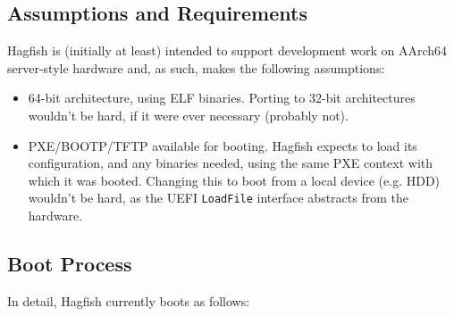 \documentclass[a4paper,twoside]{report}
\begin{document}
\subsection{Assumptions and Requirements}

Hagfish is (initially at least) intended to support development work on
AArch64 server-style hardware and, as such, makes the following assumptions:

\begin{itemize}
\item 64-bit architecture, using ELF binaries. Porting to 32-bit architectures
wouldn't be hard, if it were ever necessary (probably not).
\item PXE/BOOTP/TFTP available for booting. Hagfish expects to load its
configuration, and any binaries needed, using the same PXE context with which
it was booted. Changing this to boot from a local device (e.g. HDD) wouldn't
be hard, as the UEFI \texttt{LoadFile} interface abstracts from the hardware.
\end{itemize}

\subsection{Boot Process}

In detail, Hagfish currently boots as follows:
\end{document}

